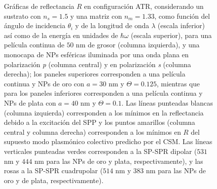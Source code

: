 \begin{figure}[h!]
\vspace*{-.7em}
\caption{Gráficas de reflectancia $R$ en configuración ATR, considerando un sustrato con $n_s=1.5$ y una matriz con $n_m=1.33$, como función del ángulo de incidencia $\theta_i$ y de la longitud de onda $\lambda$ (escala inferior) así como de la energía en unidades de $\hbar\omega$ (escala superior), para una película continua de $50$ nm de grosor (columna izquierda), y una monocapa de NPs esféricas iluminada por una onda plana en polarización \emph{p} (columna central) y en polarización \emph{s} (columna derecha); los paneles superiores corresponden a una película continua y NPs de oro con $a=30$ nm y $\Theta=0.125$, mientras que para los paneles inferiores corresponden a una película continua y NPs de plata  con $a=40$ nm y $\Theta=0.1$.  Las líneas punteadas blancas (columna izquierda) corresponden a los mínimos en la reflectancia debido a la excitación del SPP y los puntos amarillos (columna central y columna derecha) corresponden a los mínimos en $R$ del supuesto modo plasmónico colectivo predicho por el CSM. Las líneas verticales punteadas verdes corresponden a la SP-SPR dipolar ($531$ nm y $444$ nm para las NPs de oro y plata, respectivamente), y las rosas a la SP-SPR cuadrupolar ($514$ nm y $383$ nm para las NPs de oro y de plata, respectivamente).}
\label{fig:SPPCSM}
\end{figure}

